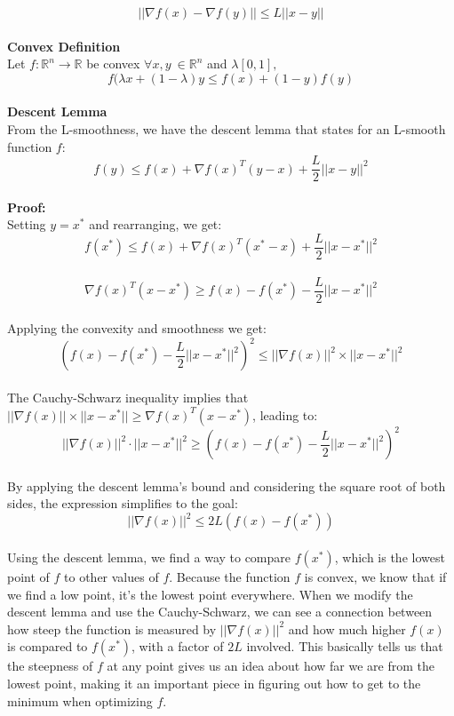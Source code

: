 \documentclass{assignment}
\newcommand{\R}{\mathbb{R}}
\begin{document}
\begin{problem}
\begin{enumerate}
    $$||\nabla f(x) - \nabla f(y)|| \leq L||x-y||$$\\

    \textbf{Convex Definition}\\
    Let $f:\R^n \rightarrow \R$ be convex $\forall x,y\ \in \R^n$ and $\lambda[0,1],$\\

    $$f(\lambda x + (1-\lambda)y \leq f(x) + (1-y) f(y)$$\\

    \textbf{Descent Lemma}\\
    From the L-smoothness, we have the descent lemma that states for an L-smooth function $f$:\\

    $$f(y) \leq f(x) + \nabla f(x)^T (y-x) + \frac{L}{2} ||x-y||^2$$\\

    \textbf{Proof:}\\
    Setting $y=x^*$ and rearranging, we get:\\

    $$f(x^*) \leq f(x) + \nabla f(x)^T (x^*-x) + \frac{L}{2} ||x-x^*||^2$$\\
    $$\nabla f(x)^T (x-x^*) \geq f(x) - f(x^*) - \frac{L}{2} ||x-x^*||^2$$\\

    Applying the convexity and smoothness we get:\\
    
    $$(f(x) - f(x^*) - \frac{L}{2} ||x-x^*||^2)^2 \leq ||\nabla f(x)||^2 \times ||x - x^*||^2$$\\

    The Cauchy-Schwarz inequality implies that $||\nabla f(x)|| \times ||x - x^*|| \geq \nabla f(x)^T (x - x^*)$, leading to:\\

    $$||\nabla f(x)||^2 \cdot ||x - x^*||^2 \geq (f(x) - f(x^*) - \frac{L}{2} ||x-x^*||^2)^2$$\\

    By applying the descent lemma's bound and considering the square root of both sides, the expression simplifies to the goal:\\

    $$||\nabla f(x)||^2 \leq 2L(f(x) - f(x^*))$$\\

   Using the descent lemma, we find a way to compare $f(x^*)$, which is the lowest point of $f$ to other values of $f$. Because the function $f$ is convex, we know that if we find a low point, it's the lowest point everywhere. When we modify the descent lemma and use the Cauchy-Schwarz, we can see a connection between how steep the function is measured by $||\nabla f(x)||^2$ and how much higher $f(x)$ is compared to $f(x^*)$, with a factor of $2L$ involved. This basically tells us that the steepness of $f$ at any point gives us an idea about how far we are from the lowest point, making it an important piece in figuring out how to get to the minimum when optimizing $f$.\\


\end{enumerate}
\end{problem}
\end{document}
